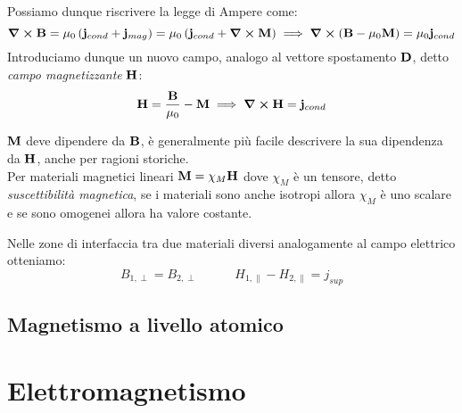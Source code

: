 \documentclass[12pt,a4paper]{article}
\begin{document}
Possiamo dunque riscrivere la legge di Ampere come:
\begin{equation*}
    \curl{\vb{B}}= \mu_0\left( \vb{j}_{cond} +\vb{j}_{mag} \right)= \mu_0\left( \vb{j}_{cond} +\curl{\vb{M}} \right)
    \implies \curl(\vb{B}-\mu_0\vb{M})= \mu_0\vb{j}_{cond}
\end{equation*}
Introduciamo dunque un nuovo campo, analogo al vettore spostamento $\vb{D}$, detto \textit{campo magnetizzante} $\vb{H}$:
\begin{equation*}
    \vb{H}= \frac{\vb{B}}{\mu_0}-\vb{M}\implies \curl{\vb{H}}= \vb{j}_{cond}
\end{equation*}

$\vb{M}$ deve dipendere da $\vb{B}$, è generalmente più facile descrivere la sua dipendenza da $\vb{H}$, anche per ragioni storiche.
\\ Per materiali magnetici lineari $\vb{M}= \chi_M\vb{H}$ dove $\chi_M$ è un tensore, detto \textit{suscettibilità magnetica}, 
se i materiali sono anche isotropi allora $\chi_M$ è uno scalare e se sono omogenei allora ha valore costante.

Nelle zone di interfaccia tra due materiali diversi analogamente al campo elettrico otteniamo:
\begin{equation*}
    B_{1,\perp}= B_{2,\perp}\qquad\quad H_{1,\parallel}-H_{2,\parallel}= j_{sup}
\end{equation*}

\subsection{Magnetismo a livello atomico}



\section{Elettromagnetismo}
\end{document}
